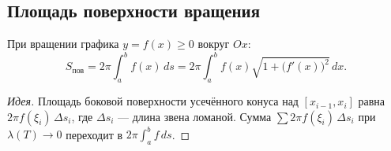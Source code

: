 \documentclass[11pt,a4paper]{article}
\theoremstyle{definition}
\theoremstyle{plain}
\newcommand{\dx}{\,dx}
\renewcommand{\ge}{\geqslant}
\begin{document}
\subsection{Площадь поверхности вращения}

При вращении графика $y=f(x)\ge0$ вокруг $Ox$:
\[
  S_{\text{пов}}=2\pi\int_a^b f(x)\,ds=2\pi\int_a^b f(x)\sqrt{1+\bigl(f'(x)\bigr)^2}\dx .
\]

\begin{proof}[Идея]
Площадь боковой поверхности усечённого конуса над $[x_{i-1},x_i]$ равна $2\pi f(\xi_i)\,\Delta s_i$,
где $\Delta s_i$ — длина звена ломаной. Сумма $\sum 2\pi f(\xi_i)\,\Delta s_i$ при $\lambda(T)\to0$
переходит в $2\pi\int_a^b f\,ds$.
\end{proof}
\end{document}
